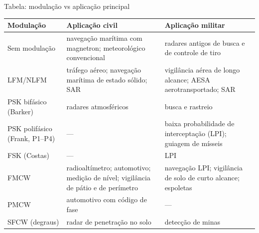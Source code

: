 \documentclass[aspectratio=169, 10pt]{beamer}
\newcommand{\cab}[1]{\textbf{\textcolor{radarcyan}{#1}}}
\begin{document}
\begin{frame}[t]{Tabela: modulação vs aplicação principal}
  \footnotesize
  \renewcommand{\arraystretch}{1.25}
  \begin{tabular}{@{}L{2.3cm}L{5.3cm}L{5.4cm}@{}}
    \toprule
    \cab{Modulação} & \cab{Aplicação civil} & \cab{Aplicação militar} \\
    \midrule
    Sem modulação & navegação marítima com magnetron; meteorológico convencional & radares antigos de busca e de controle de tiro \\
    LFM/NLFM & tráfego aéreo; navegação marítima de estado sólido; SAR & vigilância aérea de longo alcance; AESA aerotransportado; SAR \\
    PSK bifásico (Barker) & radares atmosféricos & busca e rastreio \\
    PSK polifásico (Frank, P1--P4) & --- & baixa probabilidade de interceptação (LPI); guiagem de mísseis \\
    FSK (Costas) & --- & LPI \\
    \midrule
    FMCW & radioaltímetro; automotivo; medição de nível; vigilância de pátio e de perímetro & navegação LPI; vigilância de solo de curto alcance; espoletas \\
    PMCW & automotivo com código de fase & --- \\
    SFCW (degraus) & radar de penetração no solo & detecção de minas \\
    \bottomrule
  \end{tabular}
  \vspace{3pt}

\end{frame}


\end{document}
